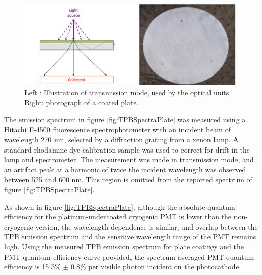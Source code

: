\begin{figure}
\centering 
\includegraphics[width=\textwidth]{./figures/PlateModeAndPhoto.pdf}
\caption{Left : Illustration of transmission mode, used by the optical units. Right: photograph of a coated plate. \label{fig:PlateCoating}}
\end{figure}

The emission spectrum in figure \ref{fig:TPBSpectraPlate} was measured using a Hitachi F-4500 fluorescence spectrophotometer with an incident beam of wavelength 270 nm, selected by a diffraction grating from a xenon lamp.  A standard rhodamine dye calibration sample was used to correct for drift in the lamp and spectrometer.  The measurement was made in transmission mode, and an artifact peak at a harmonic of twice the incident wavelength was observed between 525 and 600 nm.  This region is omitted from the reported spectrum of figure \ref{fig:TPBSpectraPlate}.  

As shown in figure \ref{fig:TPBSpectraPlate}, although the absolute quantum efficiency for the platinum-undercoated cryogenic PMT is lower than the non-cryogenic version, the wavelength dependence is similar, and overlap between the TPB emission spectrum and the sensitive wavelength range of the PMT remains high.  Using the measured TPB emission spectrum for plate coatings and the PMT quantum efficiency curve provided, the spectrum-averaged PMT quantum efficiency is 15.3\% $\pm$ 0.8\% per visible photon incident on the photocathode. 

